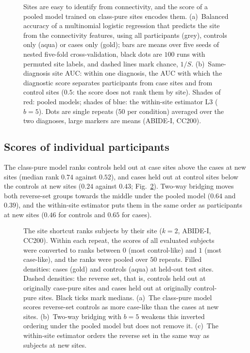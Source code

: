 \begin{figure}[tbp]
\centering
{}
\caption{Sites are easy to identify from connectivity, and the score of a pooled model trained on class-pure sites encodes them. (a)~Balanced accuracy of a multinomial logistic regression that predicts the site from the connectivity features, using all participants (grey), controls only (aqua) or cases only (gold); bars are means over five seeds of nested five-fold cross-validation, black dots are $100$ runs with permuted site labels, and dashed lines mark chance, $1/S$. (b)~Same-diagnosis site AUC: within one diagnosis, the AUC with which the diagnostic score separates participants from case sites and from control sites ($0.5$: the score does not rank them by site). Shades of red: pooled models; shades of blue: the within-site estimator L3 ($b=5$). Dots are single repeats ($50$ per condition) averaged over the two diagnoses, large markers are means (ABIDE-I, CC200).}
\label{fig:sitecode}
\end{figure}

\subsection{Scores of individual participants}

The class-pure model ranks controls held out at case sites above the cases at new sites (median rank $0.74$ against $0.52$), and cases held out at control sites below the controls at new sites ($0.24$ against $0.43$; Fig.~\ref{fig:anatomy}). Two-way bridging moves both reverse-set groups towards the middle under the pooled model ($0.64$ and $0.39$), and the within-site estimator puts them in the same order as participants at new sites ($0.46$ for controls and $0.65$ for cases).

\begin{figure}[tbp]
\centering
{}
\caption{The site shortcut ranks subjects by their site ($k=2$, ABIDE-I, CC200). Within each repeat, the scores of all evaluated subjects were converted to ranks between $0$ (most control-like) and $1$ (most case-like), and the ranks were pooled over $50$ repeats. Filled densities: cases (gold) and controls (aqua) at held-out test sites. Dashed densities: the reverse set, that is, controls held out at originally case-pure sites and cases held out at originally control-pure sites. Black ticks mark medians. (a)~The class-pure model scores reverse-set controls as more case-like than the cases at new sites. (b)~Two-way bridging with $b=5$ weakens this inverted ordering under the pooled model but does not remove it. (c)~The within-site estimator orders the reverse set in the same way as subjects at new sites.}
\label{fig:anatomy}
\end{figure}

